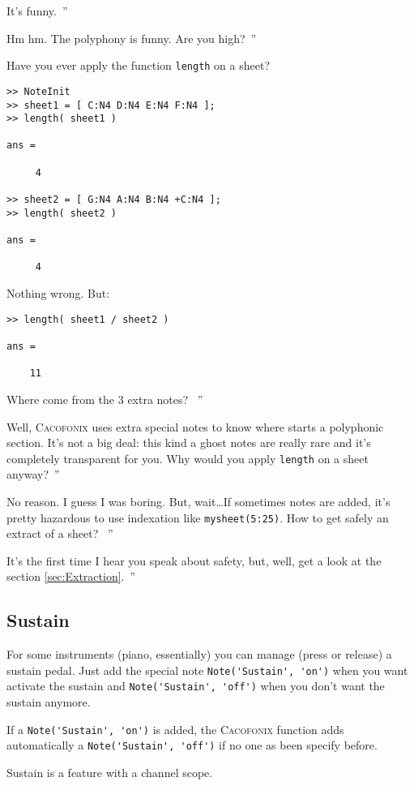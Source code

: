 \documentclass{article}
\newcommand{\cacofonix}{\textsc{Cacofonix}\xspace}
\newenvironment{meenv}{ \par \noindent \makebox[6em][r]{ \textcolor{mecolor}{Me}: `` --~}}{~''}
\newenvironment{myselfenv}{ \par \noindent \makebox[6em][r]{ \textcolor{myselfcolor}{Myself}: `` --~}}{~''}
\newcommand{\me}[1]{\begin{meenv}#1\end{meenv}}
\newcommand{\myself}[1]{\begin{myselfenv}#1\end{myselfenv}}
\begin{document}
\me{It's funny.}
\myself{Hm hm. The polyphony is funny. Are you high?}
\begin{meenv}%
Have you ever apply the function \lstinline!length! on a sheet?
\begin{lstlisting}
>> NoteInit
>> sheet1 = [ C:N4 D:N4 E:N4 F:N4 ];
>> length( sheet1 )

ans =

     4

>> sheet2 = [ G:N4 A:N4 B:N4 +C:N4 ];
>> length( sheet2 )

ans =

     4

\end{lstlisting}
Nothing wrong. But:
\begin{lstlisting}
>> length( sheet1 / sheet2 )

ans =

    11

\end{lstlisting}
Where come from the $3$ extra notes?%
\end{meenv}
\myself{Well, \cacofonix uses extra special notes to know where starts a polyphonic section. It's not a big deal: this kind a ghost notes are really rare and it's completely transparent for you. Why would you apply \lstinline!length! on a sheet anyway?}
\begin{meenv}%
No reason. I guess I was boring. But, wait\dots If sometimes notes are added, it's pretty hazardous to use indexation like \lstinline!mysheet(5:25)!. How to get safely an extract of a sheet?%
\end{meenv}
\myself{It's the first time I hear you speak about safety, but, well, get a look at the section \ref{sec:Extraction}.}

\subsection{Sustain}
\label{sec:Sustain}

For some instruments (piano, essentially) you can manage (press or release) a sustain pedal. Just add the special note \lstinline!Note('Sustain', 'on')! when you want activate the sustain and \lstinline!Note('Sustain', 'off')! when you don't want the sustain anymore.

If a \lstinline!Note('Sustain', 'on')! is added, the \cacofonix function adds automatically a \lstinline!Note('Sustain', 'off')! if no one as been specify before.

Sustain is a feature with a channel scope.
\end{document}
